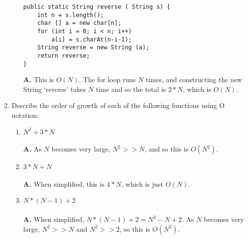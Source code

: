 \documentclass[12pt]{article}
\begin{document}
\begin{enumerate}
\begin{enumerate}[label=(\alph*)]
\begin{lstlisting}
public static String reverse ( String s) {
	int n = s.length();
	char [] a = new char[n];
	for (int i = 0; i < n; i++)
		a[i] = s.charAt(n-i-1);
	String reverse = new String (a);
	return reverse;
}
  \end{lstlisting}
  \textbf{A.} This is \(O(N)\). The for loop runs \(N\) times, and constructing the new String `reverse' takes \(N\) time and so the total is \(2*N\), which is \(O(N)\).
  \end{enumerate}
  \item
  Describe the order of growth of each of the following functions using O notation:
  \begin{enumerate}[label=(\alph*)]
    \item \(N^2 + 3 * N\)
    \\\\
    \textbf{A.} As \(N\) becomes very large, \(N^2 >> N\), and so this is \(O(N^2)\).
    \\
    \item \(3 * N + N\)
    \\\\
    \textbf{A.} When simplified, this is \(4 * N\), which is just \(O(N)\).
    \\
    \item \(N * (N - 1) + 2\)
    \\\\
    \textbf{A.} When simplified, $N * (N - 1) + 2 = N^2 - N + 2$. As \(N\) becomes very large, \(N^2 >> N\) and \(N^2 >> 2\), so this is \(O(N^2)\).
    \\
  \end{enumerate}
  
\end{enumerate}

 
\end{document}
